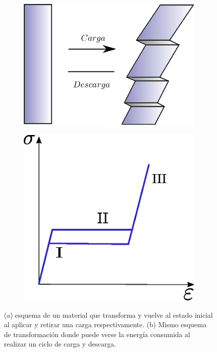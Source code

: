\documentclass[a4paper,12pt,fleqn,twoside,openany]{book}
\begin{document}
 
 \begin{figure}[h]
 \centering
    \begin{subfigure}{0.49\textwidth}
        \includegraphics[width=\textwidth]{Img/Introduccion/HisteresisEsquema.eps}
        \caption{}
        \label{fig:}
    \end{subfigure}
    \begin{subfigure}{0.45\textwidth}
        \includegraphics[width=\textwidth]{Img/Introduccion/Histeresis.eps}
        \caption{}
        \label{fig:EspA}
    \end{subfigure}

  \label{fig: proceso}
  \caption{(a) esquema de un material que transforma y vuelve al estado inicial al aplicar y retirar una carga respectivamente. (b)
  Mismo esquema de transformación donde puede verse la energía consumida al realizar un ciclo de carga y descarga.}
\end{figure}
 
\end{document}
